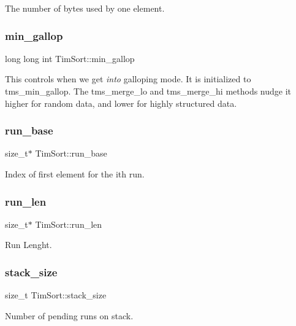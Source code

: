 The number of bytes used by one element. \mbox{\label{struct_tim_sort_af4e7fef2199d2679c953b8bd3565d191}} 
\subsubsection{\texorpdfstring{min\_gallop}{min\_gallop}}
{\footnotesize\ttfamily long long int Tim\+Sort\+::min\+\_\+gallop}

This controls when we get {\itshape into} galloping mode. It is initialized to tms\+\_\+min\+\_\+gallop. The tms\+\_\+merge\+\_\+lo and tms\+\_\+merge\+\_\+hi methods nudge it higher for random data, and lower for highly structured data. \mbox{\label{struct_tim_sort_ae0dad096ec6dd11f7d37eca1a9a8886b}} 
\subsubsection{\texorpdfstring{run\_base}{run\_base}}
{\footnotesize\ttfamily size\+\_\+t$\ast$ Tim\+Sort\+::run\+\_\+base}

Index of first element for the ith run. \mbox{\label{struct_tim_sort_aaf3301ea993020bb46b98309fca6fa73}} 
\subsubsection{\texorpdfstring{run\_len}{run\_len}}
{\footnotesize\ttfamily size\+\_\+t$\ast$ Tim\+Sort\+::run\+\_\+len}

Run Lenght. \mbox{\label{struct_tim_sort_aeafc74038940336d5e72f707ecff09b8}} 
\subsubsection{\texorpdfstring{stack\_size}{stack\_size}}
{\footnotesize\ttfamily size\+\_\+t Tim\+Sort\+::stack\+\_\+size}

Number of pending runs on stack. \mbox{\label{struct_tim_sort_a8443b25e49565bc8ca3fc5132edaede4}} 
